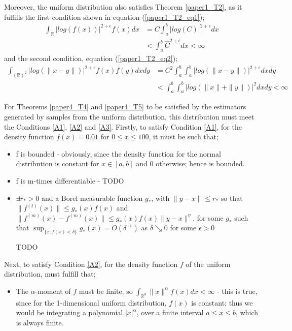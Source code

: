 \documentclass{report}
\begin{document}
Moreover, the uniform distribution also satisfies Theorem \ref{paper1_T2}, as it fulfills the first condition shown in equation (\ref{paper1_T2_eq1});
\begin{align} \nonumber
\int_{\mathbb{R}} | log(f(x))|^{2 + \epsilon} f(x) dx  &= C \int_{a}^{b} | log  (C)|^{2 + \epsilon} dx \\ \nonumber
&< \int_{a}^{b} \hat{C}^{2 + \epsilon} dx < \infty \nonumber
\end{align}
and the second condition, equation (\ref{paper1_T2_eq2});
\begin{align} \nonumber
\int_{(\mathbb{R})^2} | log(\|x-y\|)|^{2+ \epsilon} f(x) f(y) dx dy  &= C^2 \int_{a}^{b} \int_{a}^{b}| log(\|x-y\|)|^{2+ \epsilon} dx dy \\ \nonumber
&< \int_{a}^{b} \int_{a}^{b} | log(\|x\| + \|y\|)|^2 dx dy < \infty \nonumber
\end{align}

For Theorems \ref{paper4_T4} and \ref{paper4_T5} to be satisfied by the estimators generated by samples from the uniform distribution, this distribution must meet the Conditions \ref{A1}, \ref{A2} and \ref{A3}. 
Firstly, to satisfy Condition \ref{A1}, for the density function $f(x) = 0.01$ for $0 \leq x \leq 100$, it must be such that;
\begin{itemize}
\item f is bounded - obviously, since the density function for the normal distribution is constant for $x \in [a, b]$ and $0$ otherwise; hence is bounded.

\item f is m-times differentiable - TODO

\item $\exists r_{*} > 0$ and a Borel measurable function $g_{*}$, with $\|y-x\| \leq r_{*}$ so that $\|f^{(t)}(x)\| \leq g_{*}(x) f(x)$ and $\|f^{(m)}(x) - f^{(m)}(x)\| \leq g_{*}(x) f(x)\|y - x\|^{\eta}$, for some $g_{*}$ such that $\sup_{\{x : f(x) < \delta\}} g_{*}(x) = O(\delta^{-\epsilon})$ as $\delta \searrow 0$ for some $\epsilon >0$

TODO

\end{itemize}

Next, to satisfy Condition \ref{A2}, for the density function $f$ of the uniform distribution, must fulfill that;
\begin{itemize}
\item The $\alpha$-moment of $f$ must be finite, so $\int_{\mathbb{R}^{d}} \| x \|^{\alpha} f(x) dx < \infty$ - this is true, since for the 1-dimensional uniform distribution, $f(x)$ is constant; thus we would be integrating a polynomial $|x|^{\alpha}$, over a finite interval $a \leq x \leq b$, which is always finite.
\end{itemize}
\end{document}
